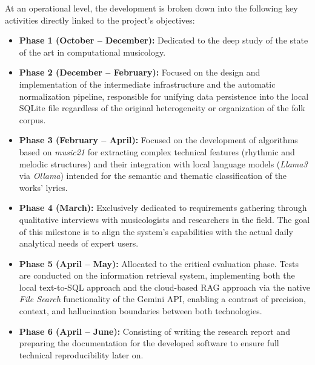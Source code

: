 At an operational level, the development is broken down into the following key activities directly linked to the project's objectives:
\begin{itemize}
    \item \textbf{Phase 1 (October -- December):} Dedicated to the deep study of the state of the art in computational musicology.
    \item \textbf{Phase 2 (December -- February):} Focused on the design and implementation of the intermediate infrastructure and the automatic normalization pipeline, responsible for unifying data persistence into the local SQLite file regardless of the original heterogeneity or organization of the folk corpus.
    \item \textbf{Phase 3 (February -- April):} Focused on the development of algorithms based on \textit{music21} for extracting complex technical features (rhythmic and melodic structures) and their integration with local language models (\textit{Llama3} via \textit{Ollama}) intended for the semantic and thematic classification of the works' lyrics.
    \item \textbf{Phase 4 (March):} Exclusively dedicated to requirements gathering through qualitative interviews with musicologists and researchers in the field. The goal of this milestone is to align the system's capabilities with the actual daily analytical needs of expert users.
    \item \textbf{Phase 5 (April -- May):} Allocated to the critical evaluation phase. Tests are conducted on the information retrieval system, implementing both the local text-to-SQL approach and the cloud-based RAG approach via the native \textit{File Search} functionality of the Gemini API, enabling a contrast of precision, context, and hallucination boundaries between both technologies.
    \item \textbf{Phase 6 (April -- June):} Consisting of writing the research report and preparing the documentation for the developed software to ensure full technical reproducibility later on.
\end{itemize}

